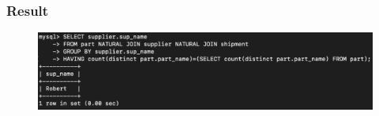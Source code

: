 \documentclass[12pt]{article}
\begin{document}
\subsubsection{Result}
\begin{figure}[!hbt]
    \centering
    \includegraphics[scale=0.65]{screenshots/5c.png}
    \label{fig:my_label1}
\end{figure}
\newpage
\end{document}
